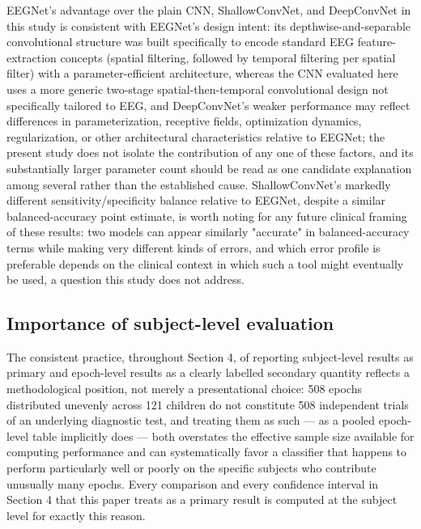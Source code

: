 \documentclass[a4paper,fleqn]{cas-sc}
\begin{document}
EEGNet's advantage over the plain CNN, ShallowConvNet, and DeepConvNet in this study is consistent with EEGNet's design intent: its depthwise-and-separable convolutional structure was built specifically to encode standard EEG feature-extraction concepts (spatial filtering, followed by temporal filtering per spatial filter) with a parameter-efficient architecture, whereas the CNN evaluated here uses a more generic two-stage spatial-then-temporal convolutional design not specifically tailored to EEG, and DeepConvNet's weaker performance may reflect differences in parameterization, receptive fields, optimization dynamics, regularization, or other architectural characteristics relative to EEGNet; the present study does not isolate the contribution of any one of these factors, and its substantially larger parameter count should be read as one candidate explanation among several rather than the established cause. ShallowConvNet's markedly different sensitivity/specificity balance relative to EEGNet, despite a similar balanced-accuracy point estimate, is worth noting for any future clinical framing of these results: two models can appear similarly "accurate" in balanced-accuracy terms while making very different kinds of errors, and which error profile is preferable depends on the clinical context in which such a tool might eventually be used, a question this study does not address.



\subsection{Importance of subject-level evaluation}

The consistent practice, throughout Section 4, of reporting subject-level results as primary and epoch-level results as a clearly labelled secondary quantity reflects a methodological position, not merely a presentational choice: 508 epochs distributed unevenly across 121 children do not constitute 508 independent trials of an underlying diagnostic test, and treating them as such --- as a pooled epoch-level table implicitly does --- both overstates the effective sample size available for computing performance and can systematically favor a classifier that happens to perform particularly well or poorly on the specific subjects who contribute unusually many epochs. Every comparison and every confidence interval in Section 4 that this paper treats as a primary result is computed at the subject level for exactly this reason.
\end{document}
